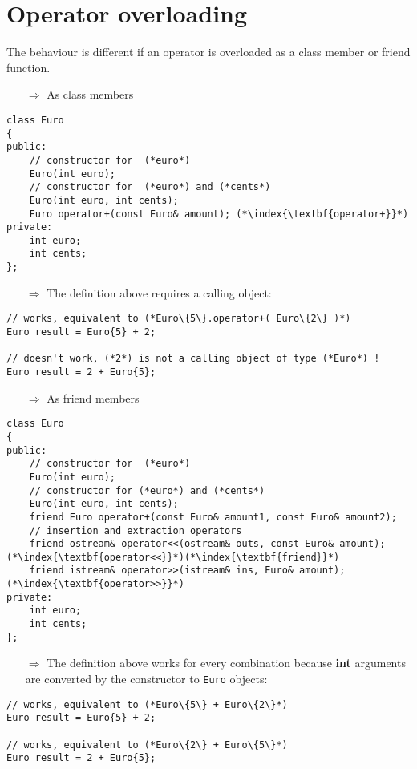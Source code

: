 \documentclass[10pt]{article}
\begin{document}
\section{Operator overloading}
\small
The behaviour is different if an operator is overloaded as  a class member or 
friend function.
\begin{enumerate}
\item[$\Rightarrow$] As class members
\end{enumerate}
\begin{lstlisting}
class Euro
{
public:
    // constructor for  (*euro*)
    Euro(int euro);
    // constructor for  (*euro*) and (*cents*)
    Euro(int euro, int cents);
    Euro operator+(const Euro& amount); (*\index{\textbf{operator+}}*)
private:
    int euro;
    int cents;
};
\end{lstlisting}
\begin{enumerate}
\item[$\Rightarrow$] The definition above requires a calling object:
\end{enumerate}
\begin{lstlisting}
// works, equivalent to (*Euro\{5\}.operator+( Euro\{2\} )*)
Euro result = Euro{5} + 2; 

// doesn't work, (*2*) is not a calling object of type (*Euro*) !
Euro result = 2 + Euro{5}; 
\end{lstlisting}
\begin{enumerate}
\item[$\Rightarrow$] As friend members
\end{enumerate}
\begin{lstlisting}
class Euro
{
public:
    // constructor for  (*euro*)
    Euro(int euro);
    // constructor for (*euro*) and (*cents*)
    Euro(int euro, int cents);
    friend Euro operator+(const Euro& amount1, const Euro& amount2);
    // insertion and extraction operators
    friend ostream& operator<<(ostream& outs, const Euro& amount);(*\index{\textbf{operator<<}}*)(*\index{\textbf{friend}}*)
    friend istream& operator>>(istream& ins, Euro& amount);(*\index{\textbf{operator>>}}*)
private:
    int euro;
    int cents;
};
\end{lstlisting}
\begin{enumerate}
\item[$\Rightarrow$] The definition above works for every combination because \textbf{int} arguments are converted by the constructor to \texttt{Euro} objects:
\end{enumerate}
\begin{lstlisting}
// works, equivalent to (*Euro\{5\} + Euro\{2\}*)
Euro result = Euro{5} + 2; 

// works, equivalent to (*Euro\{2\} + Euro\{5\}*)
Euro result = 2 + Euro{5}; 
\end{lstlisting}
%
%
\end{document}
